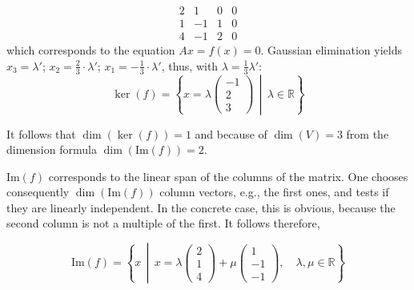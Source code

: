 \[
\begin{array}{cccc}
2 & 1 & 0 & 0 \\
1 & -1 & 1 & 0 \\
4 & -1 & 2 & 0
\end{array}
\]
which corresponds to the equation \(Ax = f(x) = 0\). Gaussian 
elimination yields \(x_3 = \lambda'\); 
\(x_2 = \frac{2}{3} \cdot \lambda'\); \(x_1 = -\frac{1}{3} \cdot \lambda'\), 
thus, with \(\lambda = \frac{1}{3} \lambda'\):
\[
\ker(f) =
\left\{
x = \lambda
\begin{pmatrix}
-1 \\
2 \\
3
\end{pmatrix}
\, \middle| \, \lambda \in \mathbb{R}
\right\}
\]

It follows that \(\dim(\ker(f)) = 1\) and because of \(\dim(V) = 3\) from the dimension 
formula \(\dim(\text{Im}(f)) = 2\). 

\(\text{Im}(f)\) corresponds to the linear 
span of the columns of the matrix. One chooses consequently \(\dim(\text{Im}(f))\) 
column vectors, e.g., the first ones, and tests if they are linearly independent. 
In the concrete case, this is obvious, because the second column is 
not a multiple of the first. It follows therefore,

\[
\text{Im}(f) =
\left\{
x \, \middle| \, x = \lambda
\begin{pmatrix}
2 \\
1 \\
4
\end{pmatrix} + \mu
\begin{pmatrix}
1 \\
-1 \\
-1
\end{pmatrix}
, \quad \lambda, \mu \in \mathbb{R}
\right\}
\]

